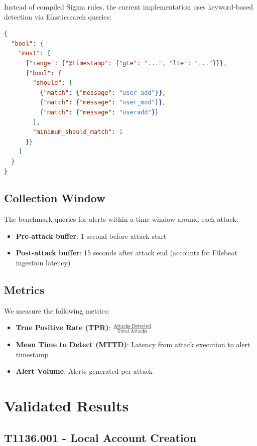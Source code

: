 \documentclass[11pt,a4paper]{article}
\begin{document}
Instead of compiled Sigma rules, the current implementation uses keyword-based detection via Elasticsearch queries:

\begin{lstlisting}[language=json,caption={Detection Query for T1136.001}]
{
  "bool": {
    "must": [
      {"range": {"@timestamp": {"gte": "...", "lte": "..."}}},
      {"bool": {
        "should": [
          {"match": {"message": "user_add"}},
          {"match": {"message": "user_mod"}},
          {"match": {"message": "useradd"}}
        ],
        "minimum_should_match": 1
      }}
    ]
  }
}
\end{lstlisting}

\subsection{Collection Window}

The benchmark queries for alerts within a time window around each attack:
\begin{itemize}
    \item \textbf{Pre-attack buffer}: 1 second before attack start
    \item \textbf{Post-attack buffer}: 15 seconds after attack end (accounts for Filebeat ingestion latency)
\end{itemize}

\subsection{Metrics}

We measure the following metrics:

\begin{itemize}
    \item \textbf{True Positive Rate (TPR)}: $\frac{\text{Attacks Detected}}{\text{Total Attacks}}$
    \item \textbf{Mean Time to Detect (MTTD)}: Latency from attack execution to alert timestamp
    \item \textbf{Alert Volume}: Alerts generated per attack
\end{itemize}

\section{Validated Results}

\subsection{T1136.001 - Local Account Creation}
\end{document}
